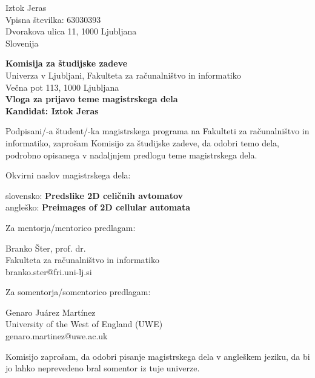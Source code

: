\documentclass[a4paper, 12pt]{article}
\begin{document}
\noindent
Iztok Jeras\\
Vpisna številka: 63030393\\
Dvorakova ulica 11, 1000 Ljubljana\\
Slovenija


\bigskip

{\bf Komisija za študijske zadeve}\\
Univerza v Ljubljani, Fakulteta za računalništvo in informatiko\\
Večna pot 113, 1000 Ljubljana\\

{\Large\bf
{\centering
    Vloga za prijavo teme magistrskega dela \\%
\large Kandidat: Iztok Jeras \\[10mm]}}


Podpisani/-a študent/-ka magistrskega programa na Fakulteti za računalništvo in informatiko, zaprošam Komisijo za študijske zadeve, da odobri temo dela, podrobno opisanega v nadaljnjem predlogu teme magistrskega dela.

Okvirni naslov magistrskega dela:

\hfill\begin{minipage}{\dimexpr\textwidth-2cm}
slovensko: {\bf Predslike 2D celičnih avtomatov}\\
angleško: {\bf Preimages of 2D cellular automata}
\end{minipage}

Za mentorja/mentorico predlagam:

\hfill\begin{minipage}{\dimexpr\textwidth-2cm}
Branko Šter, prof. dr. \\
Fakulteta za računalništvo in informatiko \\
branko.ster@fri.uni-lj.si
\end{minipage}

Za somentorja/somentorico predlagam:

\hfill\begin{minipage}{\dimexpr\textwidth-2cm}
Genaro Juárez Martínez \\
University of the West of England (UWE) \\
genaro.martinez@uwe.ac.uk \\
\end{minipage}

Komisijo zaprošam, da odobri pisanje magistrskega dela v angleškem jeziku, da bi jo lahko neprevedeno bral somentor iz tuje univerze.
\end{document}
